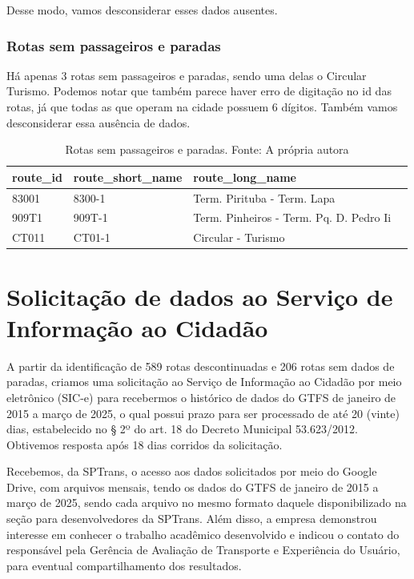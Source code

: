 Desse modo, vamos desconsiderar esses dados ausentes.

\subsubsection{Rotas sem passageiros e paradas}

Há apenas 3 rotas sem passageiros e paradas, sendo uma delas o Circular Turismo. Podemos notar que também parece haver erro de digitação no id das rotas, já que todas as que operam na cidade possuem 6 dígitos. Também vamos desconsiderar essa ausência de dados.

\begin{table}
\centering
\begin{tabular}{llll}
\toprule
 route\_id & route\_short\_name &                          route\_long\_name \\
\midrule
    83001 &           8300-1 &              Term. Pirituba - Term. Lapa \\
    909T1 &           909T-1 &  Term. Pinheiros - Term. Pq. D. Pedro Ii \\
    CT011 &           CT01-1 &                       Circular - Turismo \\
\bottomrule
\end{tabular}
\caption{Rotas sem passageiros e paradas. Fonte: A própria autora}
\end{table}

\section{Solicitação de dados ao Serviço de Informação ao Cidadão}
\label{sec:esic}

A partir da identificação de 589 rotas descontinuadas e 206 rotas sem dados de paradas, criamos uma solicitação ao Serviço de Informação ao Cidadão por meio eletrônico (SIC-e) para recebermos o histórico de dados do GTFS de janeiro de 2015 a março de 2025, o qual possui prazo para ser processado  de até 20 (vinte) dias, estabelecido no § 2º do art. 18 do Decreto Municipal 53.623/2012. Obtivemos resposta após 18 dias corridos da solicitação.

Recebemos, da SPTrans, o acesso aos dados solicitados por meio do Google Drive, com arquivos mensais, tendo os dados do GTFS de janeiro de 2015 a março de 2025, sendo cada arquivo no mesmo formato daquele disponibilizado na seção para desenvolvedores da SPTrans. Além disso, a empresa demonstrou interesse em conhecer o trabalho acadêmico desenvolvido e indicou o contato do responsável pela Gerência de Avaliação de Transporte e Experiência do Usuário, para eventual compartilhamento dos resultados.


